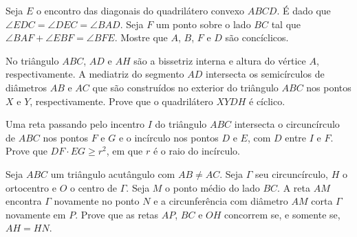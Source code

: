 \documentclass[final, 10pt, a4paper]{article}
\begin{document}
	\begin{prob}
		Seja $E$ o encontro das diagonais do quadrilátero convexo $ABCD$. É dado que $\angle EDC = \angle DEC = \angle BAD$. Seja $F$ um ponto sobre o lado $BC$ tal que $\angle BAF + \angle EBF = \angle BFE$. Mostre que $A$, $B$, $F$ e $D$ são concíclicos.
	\end{prob}
	\begin{prob}
		No triângulo $ABC$, $AD$ e $AH$ são a bissetriz interna e altura do vértice $A$, respectivamente. A mediatriz do segmento $AD$ intersecta os semicírculos de diâmetros $AB$ e $AC$ que são construídos no exterior do triângulo $ABC$ nos pontos $X$ e $Y$, respectivamente. Prove que o quadrilátero $XYDH$ é cíclico.
	\end{prob}
	\begin{prob}[Balcânica 1996]
		Uma reta passando pelo incentro $I$ do triângulo $ABC$ intersecta o circuncírculo de $ABC$ nos pontos $F$ e $G$ e o incírculo nos pontos $D$ e $E$, com $D$ entre $I$ e $F$. Prove que $DF \cdot EG \ge r^2$, em que $r$ é o raio do incírculo.
	\end{prob}
	\begin{prob}
		Seja $ABC$ um triângulo acutângulo com $AB \neq AC$. Seja $\Gamma$ seu circuncírculo, $H$ o ortocentro e $O$ o centro de $\Gamma$. Seja $M$ o ponto médio do lado $BC$. A reta $AM$ encontra $\Gamma$ novamente no ponto $N$ e a circunferência com diâmetro $AM$ corta $\Gamma$ novamente em $P$. Prove que as retas $AP$, $BC$ e $OH$ concorrem se, e somente se, $AH = HN$.	
	\end{prob}	
	
	
\end{document}
